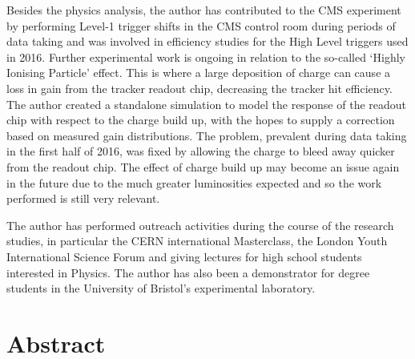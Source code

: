Besides the physics analysis, the author has contributed to the CMS experiment by performing Level-1 trigger shifts in the CMS control room during periods of data taking and was involved in efficiency studies for the High Level triggers used in 2016.
Further experimental work is ongoing in relation to the so-called `Highly Ionising Particle' effect.
This is where a large deposition of charge can cause a loss in gain from the tracker readout chip, decreasing the tracker hit efficiency.
The author created a standalone simulation to model the response of the readout chip with respect to the charge build up, with the hopes to supply a correction based on measured gain distributions.
The problem, prevalent during data taking in the first half of 2016, was fixed by allowing the charge to bleed away quicker from the readout chip.
The effect of charge build up may become an issue again in the future due to the much greater luminosities expected and so the work performed is still very relevant.


The author has performed outreach activities during the course of the research studies, in particular the CERN international Masterclass, the London Youth International Science Forum and giving lectures for high school students interested in Physics. 
The author has also been a demonstrator for degree students 
in the University of Bristol's experimental laboratory.
\clearpage

\chapter*{Abstract}


